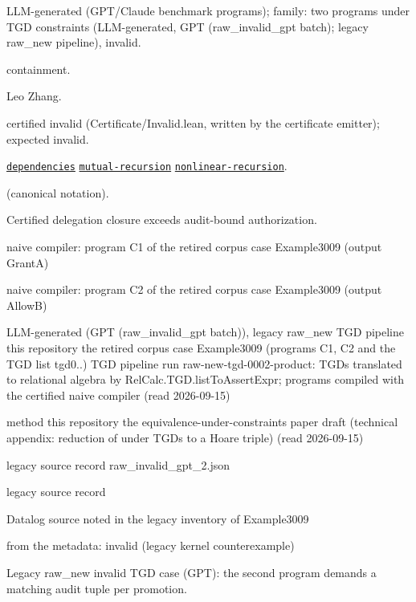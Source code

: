 \documentclass[10pt]{article}
\begin{document}
\begin{description}[leftmargin=2.6cm,style=nextline,itemsep=1pt]

\item[Category] LLM-generated (GPT/Claude benchmark programs); family: two programs under TGD constraints (LLM-generated, GPT (raw\_invalid\_gpt batch); legacy raw\_new pipeline), invalid.

\item[Kind] containment.

\item[Contributors] Leo Zhang.

\item[Status] certified invalid (Certificate/Invalid.lean, written by the certificate emitter); expected invalid.

\item[Tags] \hyperref[tag:dependencies]{\texttt{dependencies}} \hyperref[tag:mutual-recursion]{\texttt{mutual-recursion}} \hyperref[tag:nonlinear-recursion]{\texttt{nonlinear-recursion}}.

\item[Input]  (canonical notation).

\item[Summary] Certified delegation closure exceeds audit-bound authorization.

\item[Sides] naive compiler: program C1 of the retired corpus case Example3009 (output GrantA) \par naive compiler: program C2 of the retired corpus case Example3009 (output AllowB)

\item[Sources] {\raggedright LLM-generated (GPT (raw\_invalid\_gpt batch)), legacy raw\_new TGD pipeline this repository the retired corpus case Example3009 (programs C1, C2 and the TGD list tgd0..) TGD pipeline run raw-new-tgd-0002-product: TGDs translated to relational algebra by RelCalc.TGD.listToAssertExpr; programs compiled with the certified naive compiler (read 2026-09-15) \par method this repository the equivalence-under-constraints paper draft (technical appendix: reduction of  under TGDs to a Hoare triple) (read 2026-09-15) \par legacy source record raw\_invalid\_gpt\_2.json \par legacy source record  \par Datalog source noted in the legacy inventory of Example3009\par}

\item[Obstruction note] from the metadata: invalid (legacy kernel counterexample)

\item[Note] Legacy raw\_new invalid TGD case (GPT): the second program demands a matching audit tuple per promotion.

\end{description}
\end{document}
